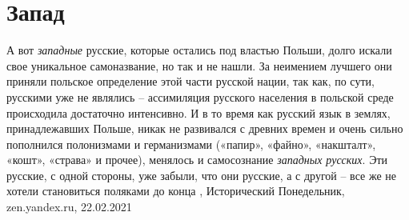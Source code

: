  
 
 
 
 
\chapter{Запад}

А вот \emph{западные} русские, которые остались под властью Польши, долго искали свое
уникальное самоназвание, но так и не нашли. За неимением лучшего они приняли
польское определение этой части русской нации, так как, по сути, русскими уже
не являлись – ассимиляция русского населения в польской среде происходила
достаточно интенсивно. И в то время как русский язык в землях, принадлежавших
Польше, никак не развивался с древних времен и очень сильно пополнился
полонизмами и германизмами («папир», «файно», «накшталт», «кошт», «страва» и
прочее), менялось и самосознание \emph{западных русских}. Эти русские, с одной
стороны, уже забыли, что они русские, а с другой – все же не хотели становиться
поляками до конца
, 
Исторический Понедельник, zen.yandex.ru, 22.02.2021 

